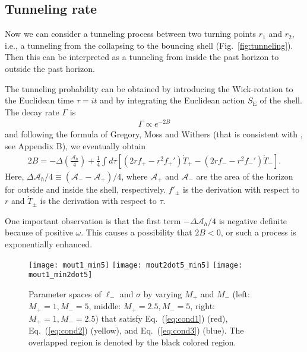 \documentclass[preprintnumbers,10pt,nofootinbib]{revtex4}
\begin{document}
\subsection{Tunneling rate}

Now we can consider a tunneling process between two turning points $r_{1}$ and $r_{2}$, i.e., a tunneling from the collapsing to the bouncing shell (Fig.~\ref{fig:tunneling}). Then this can be interpreted as a tunneling from inside the past horizon to outside the past horizon.

The tunneling probability can be obtained by introducing the Wick-rotation to the Euclidean time $\tau = it$ and by integrating the Euclidean action $S_{\mathrm{E}}$ of the shell. The decay rate $\Gamma$ is
\begin{eqnarray}
\Gamma \propto e^{-2B}
\end{eqnarray}
and following the formula of Gregory, Moss and Withers \cite{Gregory:2013hja} (that is consistent with \cite{Farhi:1989yr,Chen:2015ibc}, see Appendix B), we eventually obtain
\begin{eqnarray}\label{eq:formula}
2 B = - \Delta \left( \frac{\mathcal{A}_{h}}{4}\right) + \frac{1}{4} \int d\tau \left[ \left( 2 r f_{+} - r^{2} f_{+}' \right) \dot{T}_{+} - \left(  2 r f_{-} - r^{2} f_{-}' \right) \dot{T}_{-} \right].
\end{eqnarray}
Here, $\Delta \mathcal{A}_{h}/4 \equiv (\mathcal{A}_{-} - \mathcal{A}_{+})/4$, where $\mathcal{A}_{+}$ and $\mathcal{A}_{-}$ are the area of the horizon for outside and inside the shell, respectively. $f'_{\pm}$ is the derivation with respect to $r$ and $\dot{T}_{\pm}$ is the derivation with respect to $\tau$.

One important observation is that the first term $- \Delta \mathcal{A}_{h}/4$ is negative definite because of positive $\omega$. This causes a possibility that $2B < 0$, or such a process is exponentially enhanced.

\begin{figure}
\begin{center}
\texttt{[image: mout1\_min5]}
\texttt{[image: mout2dot5\_min5]}
\texttt{[image: mout1\_min2dot5]}
\caption{\label{fig:parameters}Parameter spaces of $\ell_{-}$ and $\sigma$ by varying $M_{+}$ and $M_{-}$ (left: $M_{+}=1, M_{-}=5$, middle: $M_{+}=2.5, M_{-}=5$, right: $M_{+}=1, M_{-}=2.5$) that satisfy Eq.~(\ref{eq:cond1}) (red), Eq.~(\ref{eq:cond2}) (yellow), and Eq.~(\ref{eq:cond3}) (blue). The overlapped region is denoted by the black colored region.}
\end{center}
\end{figure}
\end{document}
